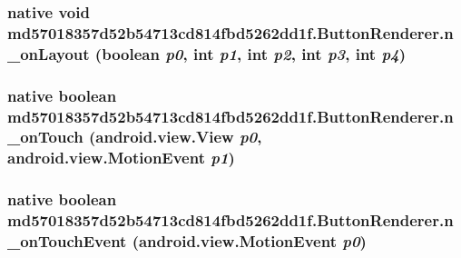 \hypertarget{classmd57018357d52b54713cd814fbd5262dd1f_1_1_button_renderer_b9f917e4f7827eafdb2630fe8dbf09ab}{
\subsubsection[{n\_\-onLayout}]{\setlength{\rightskip}{0pt plus 5cm}native void md57018357d52b54713cd814fbd5262dd1f.ButtonRenderer.n\_\-onLayout (boolean {\em p0}, \/  int {\em p1}, \/  int {\em p2}, \/  int {\em p3}, \/  int {\em p4})}}
\label{classmd57018357d52b54713cd814fbd5262dd1f_1_1_button_renderer_b9f917e4f7827eafdb2630fe8dbf09ab}


\hypertarget{classmd57018357d52b54713cd814fbd5262dd1f_1_1_button_renderer_f3e5d1d8c20e5cb8535eab5444718717}{
\subsubsection[{n\_\-onTouch}]{\setlength{\rightskip}{0pt plus 5cm}native boolean md57018357d52b54713cd814fbd5262dd1f.ButtonRenderer.n\_\-onTouch (android.view.View {\em p0}, \/  android.view.MotionEvent {\em p1})}}
\label{classmd57018357d52b54713cd814fbd5262dd1f_1_1_button_renderer_f3e5d1d8c20e5cb8535eab5444718717}


\hypertarget{classmd57018357d52b54713cd814fbd5262dd1f_1_1_button_renderer_3cb39749501d7b1e24a4e414d3eedcfd}{
\subsubsection[{n\_\-onTouchEvent}]{\setlength{\rightskip}{0pt plus 5cm}native boolean md57018357d52b54713cd814fbd5262dd1f.ButtonRenderer.n\_\-onTouchEvent (android.view.MotionEvent {\em p0})}}
\label{classmd57018357d52b54713cd814fbd5262dd1f_1_1_button_renderer_3cb39749501d7b1e24a4e414d3eedcfd}


